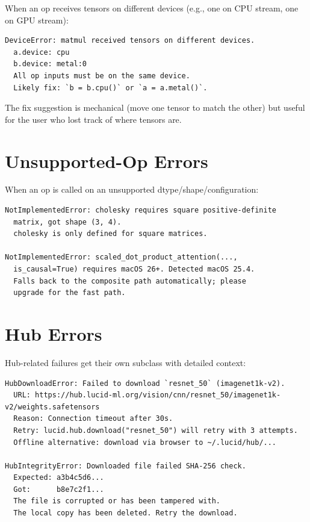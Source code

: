 When an op receives tensors on different devices (e.g., one on
CPU stream, one on GPU stream):

\begin{lstlisting}[style=lucid,language=LucidPython]
DeviceError: matmul received tensors on different devices.
  a.device: cpu
  b.device: metal:0
  All op inputs must be on the same device.
  Likely fix: `b = b.cpu()` or `a = a.metal()`.
\end{lstlisting}

The fix suggestion is mechanical (move one tensor to match
the other) but useful for the user who lost track of where
tensors are.

\section{Unsupported-Op Errors}
\label{sec:error_handling:unsupported_op}

When an op is called on an unsupported dtype/shape/configuration:

\begin{lstlisting}[style=lucid,language=LucidPython]
NotImplementedError: cholesky requires square positive-definite
  matrix, got shape (3, 4).
  cholesky is only defined for square matrices.

NotImplementedError: scaled_dot_product_attention(...,
  is_causal=True) requires macOS 26+. Detected macOS 25.4.
  Falls back to the composite path automatically; please
  upgrade for the fast path.
\end{lstlisting}

\section{Hub Errors}
\label{sec:error_handling:hub_errors}

Hub-related failures get their own subclass with detailed
context:

\begin{lstlisting}[style=lucid,language=LucidPython]
HubDownloadError: Failed to download `resnet_50` (imagenet1k-v2).
  URL: https://hub.lucid-ml.org/vision/cnn/resnet_50/imagenet1k-v2/weights.safetensors
  Reason: Connection timeout after 30s.
  Retry: lucid.hub.download("resnet_50") will retry with 3 attempts.
  Offline alternative: download via browser to ~/.lucid/hub/...

HubIntegrityError: Downloaded file failed SHA-256 check.
  Expected: a3b4c5d6...
  Got:      b8e7c2f1...
  The file is corrupted or has been tampered with.
  The local copy has been deleted. Retry the download.
\end{lstlisting}

